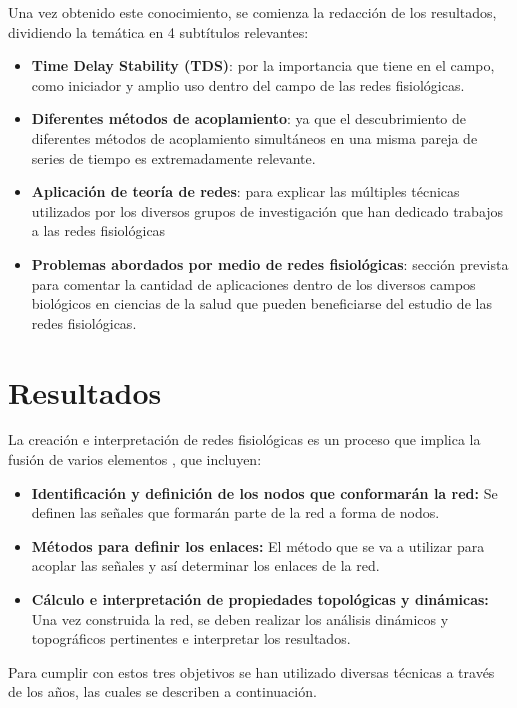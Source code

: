 \documentclass[twoside,twocolumn]{article}
\begin{document}
Una vez obtenido este conocimiento, se comienza la redacción de los resultados, dividiendo la temática en 4 subtítulos relevantes:
\begin{itemize}
  \item \textbf{Time Delay Stability (TDS)}: por la importancia que tiene en el campo, como iniciador y amplio uso dentro del campo de las redes fisiológicas.
  \item \textbf{Diferentes métodos de acoplamiento}: ya que el descubrimiento de diferentes métodos de acoplamiento simultáneos en una misma pareja de series de tiempo es extremadamente relevante.
  \item \textbf{Aplicación de teoría de redes}: para explicar las múltiples técnicas utilizados por los diversos grupos de investigación que han dedicado trabajos a las redes fisiológicas
  \item \textbf{Problemas abordados por medio de redes fisiológicas}: sección prevista para comentar la cantidad de aplicaciones dentro de los diversos campos biológicos en ciencias de la salud que pueden beneficiarse del estudio de las redes fisiológicas.
\end{itemize}


\section{Resultados}
La creación e interpretación de redes fisiológicas es un proceso que implica la fusión de varios elementos \cite{barajas2021sex}, que incluyen:
\begin{itemize}
  \item \textbf{Identificación y definición de los nodos que conformarán la red:} Se definen las señales que formarán parte de la red a forma de nodos.
  \item \textbf{Métodos para definir los enlaces:} El método que se va a utilizar para acoplar las señales y así determinar los enlaces de la red.
  \item \textbf{Cálculo e interpretación de propiedades topológicas y dinámicas:} Una vez construida la red, se deben realizar los análisis dinámicos y topográficos pertinentes e interpretar los resultados.
\end{itemize}

Para cumplir con estos tres objetivos se han utilizado diversas técnicas a través de los años, las cuales se describen a continuación.
\end{document}

